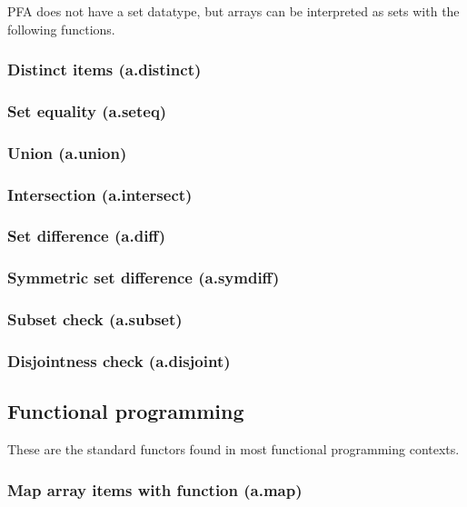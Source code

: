 \documentclass{article}
\theoremstyle{definition}
\begin{document}
PFA does not have a set datatype, but arrays can be interpreted as sets with the following functions.

\subsubsection{Distinct items (a.distinct)}

\subsubsection{Set equality (a.seteq)}

\subsubsection{Union (a.union)}

\subsubsection{Intersection (a.intersect)}

\subsubsection{Set difference (a.diff)}

\subsubsection{Symmetric set difference (a.symdiff)}

\subsubsection{Subset check (a.subset)}

\subsubsection{Disjointness check (a.disjoint)}

\subsection{Functional programming}

These are the standard functors found in most functional programming contexts.

\subsubsection{Map array items with function (a.map)}
\end{document}
